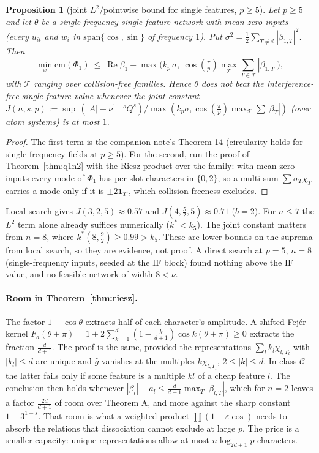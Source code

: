 \documentclass[11pt]{article}
\newtheorem{proposition}[theorem]{Proposition}
\theoremstyle{definition}
\renewcommand{\Re}{\operatorname{Re}}
\begin{document}
\begin{proposition}[joint $L^2$/pointwise bound for single features, $p\ge5$]\label{prop:joint}
Let $p\ge5$ and let $\theta$ be a single-frequency single-feature network with mean-zero inputs (every $u_{it}$ and $w_i$ in
$\mathrm{span}\{\cos,\sin\}$ of frequency $1$).  Put $\sigma^2=\frac12\sum_{T\ne\emptyset}|\beta_{1,T}|^2$.  Then
\[\min_x\mathrm{cm}(\Phi_1)\ \le\ \Re\beta_1-\max\Big(k_p\,\sigma,\ \cos(\tfrac\pi p)\max_{\mathcal T}\textstyle\sum_{T\in\mathcal T}|\beta_{1,T}|\Big),\]
with $\mathcal T$ ranging over collision-free families.  Hence $\theta$ does not beat the interference-free single-feature value whenever
the joint constant $J(n,s,p):=\sup\,(|A|-\nu^{1-s}Q^s)/\max(k_p\sigma,\cos(\frac\pi p)\max_{\mathcal T}\sum|\beta_T|)$ (over atom systems) is at most $1$.
\end{proposition}
\begin{proof}
The first term is the companion note's Theorem 14 (circularity holds for single-frequency fields at $p\ge5$).  For the second, run the
proof of Theorem~\ref{thm:q1n2} with the Riesz product over the family: with mean-zero inputs every mode of $\Phi_1$ has per-slot
characters in $\{0,2\}$, so a multi-sum $\sum\sigma_T\chi_T$ carries a mode only if it is $\pm2\mathbf 1_{T'}$, which collision-freeness excludes.
\end{proof}
Local search gives $J(3,2,5)\approx0.57$ and $J(4,\frac52,5)\approx0.71$ ($b=2$).  For $n\le7$ the $L^2$ term alone already suffices numerically
($k^*<k_5$).  The joint constant matters from $n=8$, where $k^*(8,\frac92)\ge0.99>k_5$.  These are lower bounds on the suprema from local
search, so they are evidence, not proof.  A direct search at $p=5$, $n=8$ (single-frequency inputs, seeded at the IF block) found nothing
above the IF value, and no feasible network of width $8<\nu$.

\paragraph{Room in Theorem~\ref{thm:riesz}.}  The factor $1-\cos\theta$ extracts half of each character's amplitude.
A shifted Fej\'er kernel $F_d(\theta+\pi)=1+2\sum_{k=1}^d(1-\frac k{d+1})\cos k(\theta+\pi)\ge0$ extracts the fraction
$\frac d{d+1}$.  The proof is the same, provided the representations $\sum_l k_l\chi_{l,T_l}$ with $|k_l|\le d$ are unique and
$\hat g$ vanishes at the multiples $k\chi_{l,T_l}$, $2\le|k|\le d$.  In class $\mathcal C$ the latter fails only if some feature
is a multiple $kl$ of a cheap feature $l$.  The conclusion then holds whenever $|\beta_l|-a_l\le\frac d{d+1}\max_T|\beta_{l,T}|$,
which for $n=2$ leaves a factor $\frac{2d}{d+1}$ of room over Theorem A, and more against the sharp constant $1-3^{1-s}$.  That
room is what a weighted product $\prod(1-\varepsilon\cos)$ needs to absorb the relations that dissociation cannot exclude at
large $p$.  The price is a smaller capacity: unique representations allow at most $n\log_{2d+1}p$ characters.
\end{document}
